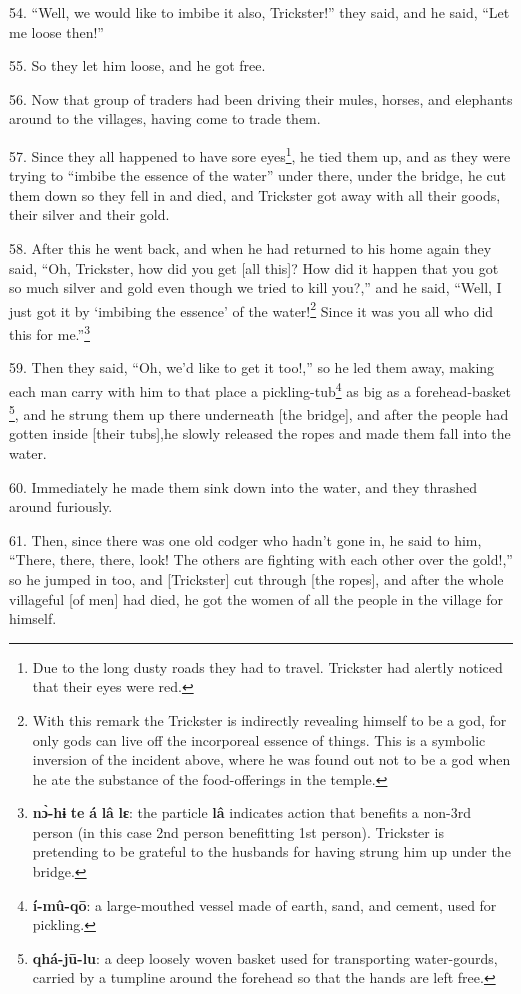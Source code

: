 54. ``Well, we would like to imbibe it also, Trickster!'' they said, and he said,
``Let me loose then!''

55. So they let him loose, and he got free.

56. Now that group of traders had been driving their mules, horses, and elephants
around to the villages, having come to trade them.

57. Since they all happened to have sore eyes\footnote{Due to the long dusty roads they had to travel. Trickster had alertly noticed that their eyes were red.}, he tied them up, and as they
were trying to ``imbibe the essence of the water'' under there, under the bridge,
he cut them down so they fell in and died, and Trickster got away with all their
goods, their silver and their gold.

58. After this he went back, and when he had returned to his home again they said,
``Oh, Trickster, how did you get [all this]? How did it happen that you got so
much silver and gold even though we tried to kill you?,'' and he said, ``Well,
I just got it by `imbibing the essence' of the water!\footnote{With this remark the Trickster is indirectly revealing himself to be a god, for only gods can live off the incorporeal essence of things. This is a symbolic inversion of the incident above, where he was found out not to be a god when he ate the substance of the food-offerings in the temple.} Since it was you all
who did this for me.''\footnote{\textbf{nɔ̀-hɨ} \textbf{te} \textbf{á} \textbf{lâ} \textbf{lɛ}: the particle \textbf{lâ} indicates action that benefits a non-3rd person (in this case 2nd person benefitting 1st person). Trickster is pretending to be grateful to the husbands for having strung him up under the bridge.}

59. Then they said, ``Oh, we'd like to get it too!,'' so he led them away, making
each man carry with him to that place a pickling-tub\footnote{\textbf{í-mû-qō}: a large-mouthed vessel made of earth, sand, and cement, used for pickling.} as big as a forehead-basket
\footnote{\textbf{qhá-jū-lu}: a deep loosely woven basket used for transporting water-gourds, carried by a tumpline around the forehead so that the hands are left free.}, and he strung them up there underneath [the bridge], and after the people
had gotten inside [their tubs],he slowly released the ropes and made them fall
into the water.

60. Immediately he made them sink down into the water, and they thrashed around
furiously.

61. Then, since there was one old codger who hadn't gone in, he said to him, ``There,
there, there, look! The others are fighting with each other over the gold!,'' so
he jumped in too, and [Trickster] cut through [the ropes], and after the whole
villageful [of men] had died, he got the women of all the people in the village
for himself.

